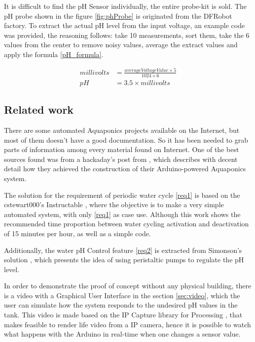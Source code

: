 It is difficult to find the pH Sensor individually, 
the entire probe-kit is sold.
The pH probe shown in the figure \ref{fig:phProbe} is originated from the DFRobot factory.
To extract the actual pH level from the input voltage,
an example code was provided,
the reasoning follows: take 10 measurements,
sort them,
take the 6 values from the center to remove noisy values,
average the extract values and apply the formula \ref{pH_formula}.

\begin{align}
    millivolts &= \frac{averageVoltageValue \times 5}{1024 \times 6}  \label{pH_formula} \\
    pH &= 3.5 \times millivolts
\end{align}


\subsection{Related work}
There are some automated Aquaponics projects available on the Internet,
but most of them doesn't have a good documentation.
So it has been needed to grab parts of information among every material found on Internet.
One of the best sources found was from a hackaday's post from \cite{GarethColeman2014},
which describes with decent detail how they achieved the construction of their Arduino-powered Aquaponics system.

The solution for the requirement of periodic water cycle \ref{req1} is based on the cstewart000's Instructable \cite{simpleArduinoAquaponics},
where the objective is to make a very simple automated system,
with only \ref{req1} as case use.
Although this work shows the recommended time proportion between water cycling activation and deactivation of 15 minutes per hour,
as well as a simple code.

Additionally,
the water pH Control feature \ref{req2} is extracted from Simonson's solution \cite{elder_austin_simonson_hyduino},
which presents the idea of using peristaltic pumps to regulate the pH level.

In order to demonstrate the proof of concept without any physical building,
there is a video with a Graphical User Interface in the section \ref{sec:video},
which the user can simulate how the system responds to the undesired pH values in the tank.
This video is made based on the IP Capture library for Processing \cite{ipcapture_2016},
that makes feasible to render life video from a IP camera,
hence it is possible to watch what happens with the Arduino in real-time when one changes a sensor value.
